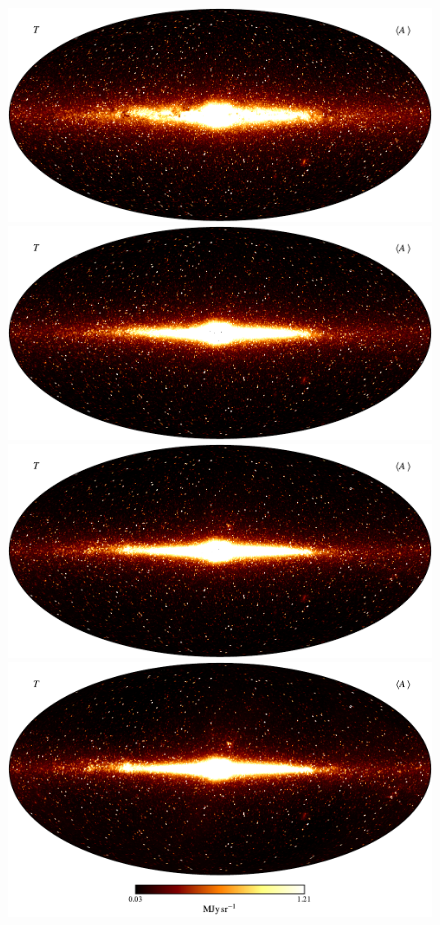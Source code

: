 \documentclass{aa}
\begin{document}
\begin{figure}
	\centering
	\includegraphics[width=0.6\linewidth]{figs/CG_DIRBE_01_n0512_v05_I_MEAN_w18_n512_c-afmhot.pdf}\\
        \includegraphics[width=0.6\linewidth]{figs/CG_DIRBE_02_n0512_v05_I_MEAN_w18_n512_c-afmhot.pdf}\\
        \includegraphics[width=0.6\linewidth]{figs/CG_DIRBE_03_n0512_v05_I_MEAN_w18_n512_c-afmhot.pdf}\\
        \includegraphics[width=0.6\linewidth]{figs/CG_DIRBE_04_n0512_v05_I_MEAN_w18_n512_cb_c-afmhot.pdf}
	\caption{}
	\label{fig:freqmaps1_4}
\end{figure}
\end{document}
